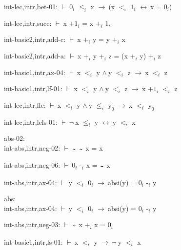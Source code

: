 \documentclass[a4paper]{article}
\newcommand{\tildesym}{\raisebox{-4pt}{\bf\~{}}}
\newcommand{\Fol}{\mbox{$\vdash\ $}}
\newcommand{\Not}{\mbox{$\neg\ $}}
\newcommand{\And}{\mbox{$\wedge\ $}}
\newcommand{\Imp}{\mbox{$\rightarrow\ $}}
\newcommand{\Equiv}{\mbox{$\leftrightarrow\ $}}
\begin{document}
int-lec,intr,bet-01: 
 \Fol $\mbox{0}_{i}$ $\mbox{$\le$}_{i}$ x \Imp (x $\mbox{$<$}_{i}$ $\mbox{1}_{i}$ \Equiv x = $\mbox{0}_{i}$)



int-lec,intr,succ: 
 \Fol x $\mbox{+1}_{i}$ = x $\mbox{+}_{i}$ $\mbox{1}_{i}$



int-basic2,intr,add-c: 
 \Fol x $\mbox{+}_{i}$ y = y $\mbox{+}_{i}$ x



int-basic2,intr,add-a: 
 \Fol x $\mbox{+}_{i}$ y $\mbox{+}_{i}$ z = (x $\mbox{+}_{i}$ y) $\mbox{+}_{i}$ z



int-basic1,intr,ax-04: 
 \Fol x $\mbox{$<$}_{i}$ y \And y $\mbox{$<$}_{i}$ z \Imp x $\mbox{$<$}_{i}$ z



int-basic1,intr,lf-01: 
 \Fol x $\mbox{$<$}_{i}$ y \And y $\mbox{$<$}_{i}$ z \Imp x $\mbox{+1}_{i}$ $\mbox{$<$}_{i}$ z



int-lec,intr,fle: 
 \Fol x $\mbox{$<$}_{i}$ y \And y $\mbox{$\le$}_{i}$ $\mbox{y}_{0}$ \Imp x $\mbox{$<$}_{i}$ $\mbox{y}_{0}$



int-lec,intr,lels-01: 
 \Fol \Not x $\mbox{$\le$}_{i}$ y \Equiv y $\mbox{$<$}_{i}$ x



\bigskip

abs-02:\\ int-abs,intr,neg-02: 
 \Fol $\tildesym$ $\tildesym$ x = x



int-abs,intr,neg-06: 
 \Fol $\mbox{0}_{i}$ $\mbox{-}_{i}$ x = $\tildesym$ x



int-abs,intr,ax-04: 
 \Fol y $\mbox{$<$}_{i}$ $\mbox{0}_{i}$ \Imp absi(y) = $\mbox{0}_{i}$ $\mbox{-}_{i}$ y



\bigskip

abs:\\ int-abs,intr,ax-04: 
 \Fol y $\mbox{$<$}_{i}$ $\mbox{0}_{i}$ \Imp absi(y) = $\mbox{0}_{i}$ $\mbox{-}_{i}$ y

int-abs,intr,neg-03: 
 \Fol $\tildesym$ x $\mbox{+}_{i}$ x = $\mbox{0}_{i}$



int-basic1,intr,ls-01: 
 \Fol x $\mbox{$<$}_{i}$ y \Imp \Not y $\mbox{$<$}_{i}$ x
\end{document}
